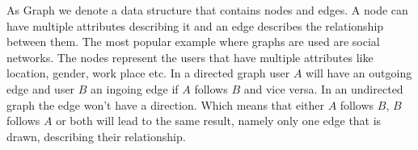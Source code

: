 		As Graph we denote a data structure that contains nodes and edges. A node can have multiple attributes describing it and an edge describes the relationship between them. The most popular example where graphs are used are social networks. The nodes represent the users that have multiple attributes like location, gender, work place etc. In a directed graph user $A$ will have an outgoing edge and user $B$ an ingoing edge if $A$ follows $B$ and vice versa. In an undirected graph the edge won't have a direction. Which means that either $A$ follows $B$, $B$ follows $A$ or both will lead to the same result, namely only one edge that is drawn, describing their relationship.
		
		
		
		
		
		
		
		
		
		
		
		
		
		
		
		
		
		
		
		
		
		
		
		
		